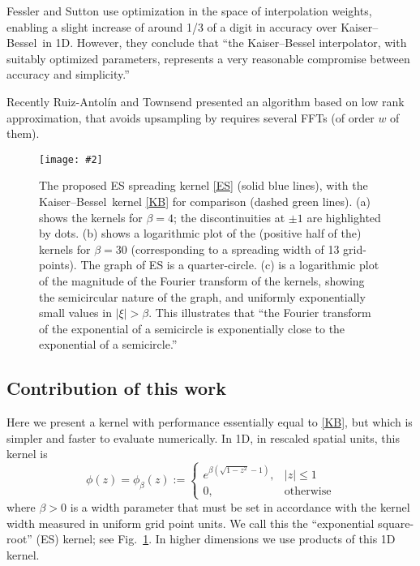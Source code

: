 \documentclass[10pt]{article}
\newcommand{\be}{\begin{equation}}
\newcommand{\ee}{\end{equation}}
\newcommand{\bfi}{\begin{figure}}
\newcommand{\efi}{\end{figure}}
\newcommand{\ca}[2]{\caption{#1 \label{#2}}}
\newcommand{\ig}[2]{\texttt{[image: \#2]}}
\newcommand{\KB}{Kaiser--Bessel}
\newcommand{\freq}{\beta}          %
\begin{document}
Fessler and Sutton \cite{fessler} use optimization in the space of
interpolation weights, enabling a slight increase of around 1/3 of a
digit in accuracy over \KB\ in 1D. However, they conclude that
``the
Kaiser--Bessel interpolator, with suitably optimized parameters,
represents a very reasonable compromise between accuracy and
simplicity.''

Recently Ruiz-Antol\'in and Townsend
\cite{townsendnufft} presented an algorithm
based on low rank approximation, that
avoids upsampling by requires several FFTs (of order $w$ of them).



\bfi[t]  %
\ig{width=6.5in}{kernel.eps}
\ca{The proposed ES spreading kernel
  \eqref{ES} (solid blue lines), with the \KB\ kernel \eqref{KB} for comparison
  (dashed green lines).
  (a) shows the kernels for $\freq=4$; the discontinuities at
  $\pm 1$ are highlighted by dots.
  (b) shows a logarithmic plot of the (positive half of the)
  kernels for $\freq=30$
  (corresponding to a spreading width of 13 grid-points).
  The graph of ES is a quarter-circle.
  (c) is a logarithmic plot of the magnitude of the
  Fourier transform of the kernels,
  showing the semicircular nature of the graph, and uniformly exponentially
  small values in $|\xi|>\freq$.
  This illustrates that ``the Fourier transform of the exponential
  of a semicircle is exponentially close to the exponential of a semicircle.''
}{f:kernel}
\efi


\subsection{Contribution of this work}


Here we present a kernel with performance essentially
equal to \eqref{KB}, but which is simpler and faster to evaluate numerically.
In 1D, in rescaled spatial units, this kernel is
\be
\phi(z) = \phi_\freq(z) :=
\left\{\begin{array}{ll}
e^{\freq (\sqrt{1-z^2}-1)}, & |z|\le 1\\
0, & \mbox{otherwise}
\end{array}
\right.
\label{ES}
\ee
where $\freq>0$ is a width parameter that must be set
in accordance with the kernel width measured in uniform grid point units.
We call this the ``exponential square-root'' (ES) kernel;
see Fig.~\ref{f:kernel}.
In higher dimensions we use products of this 1D kernel.
\end{document}
